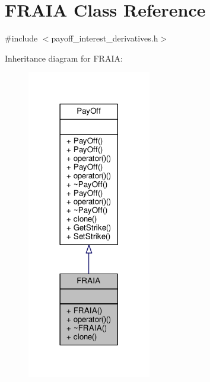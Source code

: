 \hypertarget{classFRAIA}{}\section{F\+R\+A\+IA Class Reference}
\label{classFRAIA}


{\ttfamily \#include $<$payoff\+\_\+interest\+\_\+derivatives.\+h$>$}



Inheritance diagram for F\+R\+A\+IA\+:
\nopagebreak
\begin{figure}[H]
\begin{center}
\leavevmode
\includegraphics[width=153pt]{classFRAIA__inherit__graph}
\end{center}
\end{figure}


